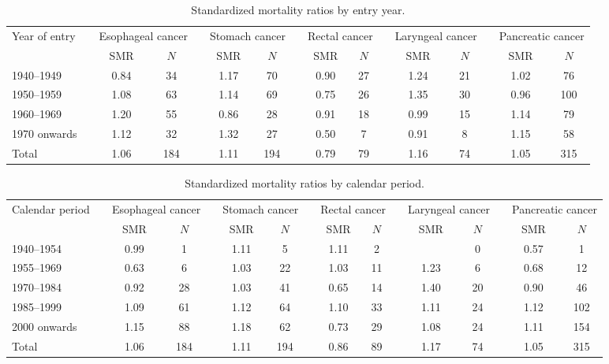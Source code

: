 \documentclass[]{article}
\begin{document}
\begin{table}[H]
\centering
\caption{Standardized mortality ratios by entry year.} 
\begin{tabular}{lccccccccccccccc}
  \hline \multirow{2}{*}{Year of entry} & &\multicolumn{2}{C{0.1\linewidth}}{Esophageal cancer} & &\multicolumn{2}{C{0.1\linewidth}}{Stomach cancer} & &\multicolumn{2}{C{0.1\linewidth}}{Rectal cancer} & &\multicolumn{2}{C{0.1\linewidth}}{Laryngeal cancer} & &\multicolumn{2}{C{0.1\linewidth}}{Pancreatic cancer} \\ 
 \cline{3-4} \cline{6-7} \cline{9-10} \cline{12-13} \cline{15-16} 
  &   & SMR & $N$ &   & SMR & $N$ &   & SMR & $N$ &   & SMR & $N$ &   & SMR & $N$ \\ 
  \midrule
1940--1949 &  & 0.84 & 34 &  & 1.17 & 70 &  & 0.90 & 27 &  & 1.24 & 21 &  & 1.02 & 76 \\ 
  1950--1959 &  & 1.08 & 63 &  & 1.14 & 69 &  & 0.75 & 26 &  & 1.35 & 30 &  & 0.96 & 100 \\ 
  1960--1969 &  & 1.20 & 55 &  & 0.86 & 28 &  & 0.91 & 18 &  & 0.99 & 15 &  & 1.14 & 79 \\ 
  1970 onwards &  & 1.12 & 32 &  & 1.32 & 27 &  & 0.50 & 7 &  & 0.91 & 8 &  & 1.15 & 58 \\ 
  Total &  & 1.06 & 184 &  & 1.11 & 194 &  & 0.79 & 79 &  & 1.16 & 74 &  & 1.05 & 315 \\ 
   \bottomrule
\end{tabular}
\end{table}

\begin{table}[H]
\centering
\caption{Standardized mortality ratios by calendar period.} 
\begin{tabular}{lccccccccccccccc}
  \hline \multirow{2}{*}{Calendar period} & &\multicolumn{2}{C{0.1\linewidth}}{Esophageal cancer} & &\multicolumn{2}{C{0.1\linewidth}}{Stomach cancer} & &\multicolumn{2}{C{0.1\linewidth}}{Rectal cancer} & &\multicolumn{2}{C{0.1\linewidth}}{Laryngeal cancer} & &\multicolumn{2}{C{0.1\linewidth}}{Pancreatic cancer} \\ 
 \cline{3-4} \cline{6-7} \cline{9-10} \cline{12-13} \cline{15-16} 
  &   & SMR & $N$ &   & SMR & $N$ &   & SMR & $N$ &   & SMR & $N$ &   & SMR & $N$ \\ 
  \midrule
1940--1954 &  & 0.99 & 1 &  & 1.11 & 5 &  & 1.11 & 2 &  &  & 0 &  & 0.57 & 1 \\ 
  1955--1969 &  & 0.63 & 6 &  & 1.03 & 22 &  & 1.03 & 11 &  & 1.23 & 6 &  & 0.68 & 12 \\ 
  1970--1984 &  & 0.92 & 28 &  & 1.03 & 41 &  & 0.65 & 14 &  & 1.40 & 20 &  & 0.90 & 46 \\ 
  1985--1999 &  & 1.09 & 61 &  & 1.12 & 64 &  & 1.10 & 33 &  & 1.11 & 24 &  & 1.12 & 102 \\ 
  2000 onwards &  & 1.15 & 88 &  & 1.18 & 62 &  & 0.73 & 29 &  & 1.08 & 24 &  & 1.11 & 154 \\ 
  Total &  & 1.06 & 184 &  & 1.11 & 194 &  & 0.86 & 89 &  & 1.17 & 74 &  & 1.05 & 315 \\ 
   \bottomrule
\end{tabular}
\end{table}
\end{document}
